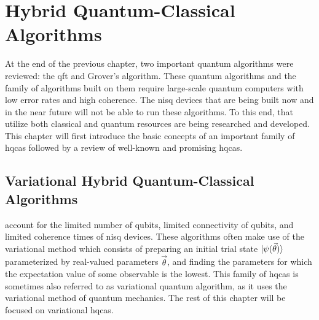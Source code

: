\chapter[Hybrid Quantum-Classical Algorithms]{Hybrid Quantum-Classical\\Algorithms} \label{chap:hybrid-quantum-classical-algorithms}
At the end of the previous chapter, two important quantum algorithms were reviewed: the \gls{qft} and Grover's algorithm.
These quantum algorithms and the family of algorithms built on them require large-scale quantum computers with low error rates and high coherence.
The \gls{nisq} devices that are being built now and in the near future will not be able to run these algorithms.
To this end,  that utilize both classical and quantum resources are being researched and developed.
This chapter will first introduce the basic concepts of an important family of \glspl{hqca} followed by a review of well-known and promising \glspl{hqca}.

\section{Variational Hybrid Quantum-Classical Algorithms}
 account for the limited number of qubits, limited connectivity of qubits, and limited coherence times of \gls{nisq} devices.
These algorithms often make use of the variational method which consists of preparing an initial trial state $\vert{\psi(\vec{\theta})}\rangle$ parameterized by real-valued parameters $\vec{\theta}$, and finding the parameters for which the expectation value of some observable is the lowest.
This family of \glspl{hqca} is sometimes also referred to as variational quantum algorithm, as it uses the variational method of quantum mechanics.
The rest of this chapter will be focused on variational \glspl{hqca}.

